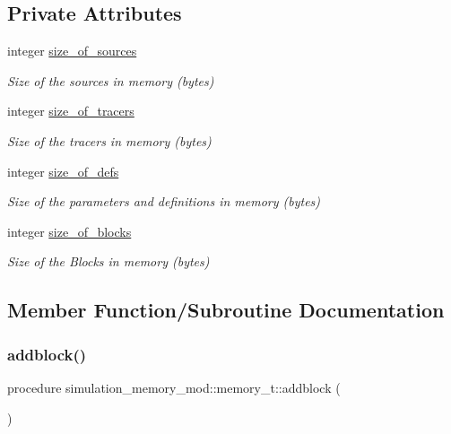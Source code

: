 \subsection*{Private Attributes}
\begin{DoxyCompactItemize}
\item 
integer \hyperlink{structsimulation__memory__mod_1_1memory__t_a3e461b40b58c78011285068a2afaf2b8}{size\+\_\+of\+\_\+sources}
\begin{DoxyCompactList}\small\item\em Size of the sources in memory (bytes) \end{DoxyCompactList}\item 
integer \hyperlink{structsimulation__memory__mod_1_1memory__t_a7b1960036177b6612be260699fcdb19a}{size\+\_\+of\+\_\+tracers}
\begin{DoxyCompactList}\small\item\em Size of the tracers in memory (bytes) \end{DoxyCompactList}\item 
integer \hyperlink{structsimulation__memory__mod_1_1memory__t_a14c7c2387ac9b23e6f3b5b4ab0433e50}{size\+\_\+of\+\_\+defs}
\begin{DoxyCompactList}\small\item\em Size of the parameters and definitions in memory (bytes) \end{DoxyCompactList}\item 
integer \hyperlink{structsimulation__memory__mod_1_1memory__t_aa0426bef9384f95d4317ca5b03b63428}{size\+\_\+of\+\_\+blocks}
\begin{DoxyCompactList}\small\item\em Size of the Blocks in memory (bytes) \end{DoxyCompactList}\end{DoxyCompactItemize}


\subsection{Member Function/\+Subroutine Documentation}
\mbox{\label{structsimulation__memory__mod_1_1memory__t_a374c166c7b2412805d1c4e513bdba93b}} 
\subsubsection{\texorpdfstring{addblock()}{addblock()}}
{\footnotesize\ttfamily procedure simulation\+\_\+memory\+\_\+mod\+::memory\+\_\+t\+::addblock (\begin{DoxyParamCaption}{ }\end{DoxyParamCaption})\hspace{0.3cm}{\ttfamily [private]}}

